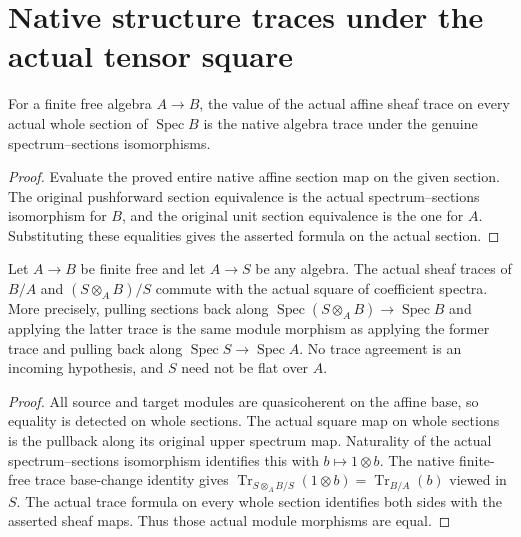 \section{Native structure traces under the actual tensor square}

\begin{lemma}
\label{lem:kn-structure-trace-raw-top}
\leanok
For a finite free algebra $A\to B$, the value of the actual affine
sheaf trace on every actual whole section of $\operatorname{Spec}B$
is the native algebra trace under the genuine spectrum--sections
isomorphisms.
\end{lemma}
\begin{proof}
Evaluate the proved entire native affine section map on the given
section. The original pushforward section equivalence is the actual
spectrum--sections isomorphism for $B$, and the original unit section
equivalence is the one for $A$. Substituting these equalities gives the
asserted formula on the actual section.
\end{proof}

\begin{lemma}
\label{lem:kn-structure-trace-tensor-sheaf-naturality}
\leanok
Let $A\to B$ be finite free and let $A\to S$ be any algebra. The
actual sheaf traces of $B/A$ and $(S\otimes_A B)/S$ commute with the
actual square of coefficient spectra. More precisely, pulling sections
back along $\operatorname{Spec}(S\otimes_A B)\to\operatorname{Spec}B$
and applying the latter trace is the same module morphism as applying
the former trace and pulling back along
$\operatorname{Spec}S\to\operatorname{Spec}A$. No trace agreement is
an incoming hypothesis, and $S$ need not be flat over $A$.
\end{lemma}
\begin{proof}
All source and target modules are quasicoherent on the affine base,
so equality is detected on whole sections. The actual square map on
whole sections is the pullback along its original upper spectrum map.
Naturality of the actual spectrum--sections isomorphism identifies
this with $b\mapsto1\otimes b$. The native finite-free trace
base-change identity gives
$\operatorname{Tr}_{S\otimes_A B/S}(1\otimes b)
=\operatorname{Tr}_{B/A}(b)$ viewed in $S$. The actual trace formula
on every whole section identifies both sides with the asserted sheaf
maps. Thus those actual module morphisms are equal.
\end{proof}
